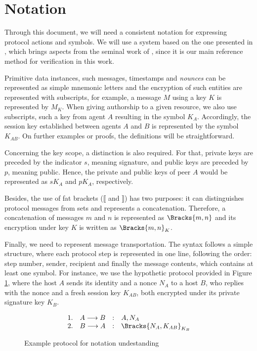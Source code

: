 \section{Notation}
Through this document, we will need a consistent notation for expressing protocol actions and symbols. We will use a system based on the one presented in \cite{Bella2007}, which brings aspects from the seminal work of \cite{Burrows90}, since it is our main reference method for verification in this work.

Primitive data instances, such messages, timestamps and \textit{nounces} can be represented as simple mnemonic letters and the encryption of such entities are represented with subscripts, for example, a message $M$ using a key $K$ is represented by $M_K$. When giving authorship to a given resource, we also use subscripts, such a key from agent $A$ resulting in the symbol $K_A$. Accordingly, the session key established between agents $A$ and $B$ is represented by the symbol $K_{AB}$. On further examples or proofs, the definitions will be straightforward.

Concerning the key scope, a distinction is also required. For that, private keys are preceded by the indicator $s$, meaning signature, and public keys are preceded by $p$, meaning public. Hence, the private and public keys of peer $A$ would be represented as $sK_A$ and $pK_A$, respectively.

Besides, the use of fat brackets ($\lBrack$ and $\rBrack$) has two purposes: it can distinguishes protocol messages from sets and represents a concatenation. Therefore, a concatenation of messages $m$ and $n$ is represented as $\Bracks{m,n}$ and its encryption under key $K$ is written as $\Bracks{m,n}_K$.

Finally, we need to represent message transportation. The syntax follows a simple structure, where each protocol step is represented in one line, following the order: step number, sender, recipient and finally the message contents, which contains at least one symbol. For instance, we use the hypothetic protocol provided in Figure \ref{prt:notation-example}, where the host $A$ sends its identity and a nonce $N_A$ to a host $B$, who replies with the nonce and a fresh session key $K_{AB}$, both encrypted under its private signature key $K_B$.

\begin{figure}[ht]
  \centering
    \[
    \begin{array}{rlcl}
      1. & A \longrightarrow B &:& A, N_A \\
      2. & B \longrightarrow A &:& \Bracks{N_A, K_{AB}}_{K_B} \\
    \end{array}
    \]
  \caption{Example protocol for notation undestanding}
  \label{prt:notation-example}
\end{figure}

